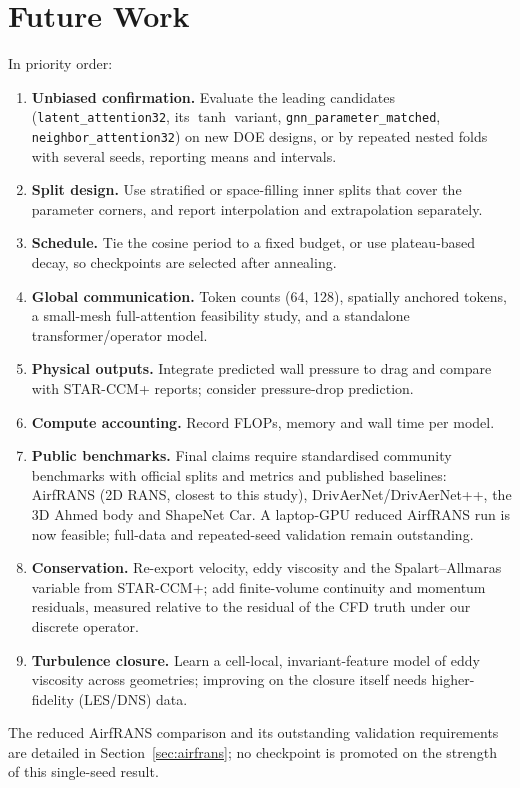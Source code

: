 \documentclass[journal]{IEEEtran}
\begin{document}
\section{Future Work}
\label{sec:future}
In priority order:
\begin{enumerate}
\item \textbf{Unbiased confirmation.} Evaluate the leading candidates
(\texttt{latent\_attention32}, its $\tanh$ variant, \texttt{gnn\_parameter\_matched},
\texttt{neighbor\_attention32}) on new DOE designs, or by repeated nested
folds with several seeds, reporting means and intervals.
\item \textbf{Split design.} Use stratified or space-filling inner splits that
cover the parameter corners, and report interpolation and extrapolation
separately.
\item \textbf{Schedule.} Tie the cosine period to a fixed budget, or use
plateau-based decay, so checkpoints are selected after annealing.
\item \textbf{Global communication.} Token counts (64, 128), spatially anchored
tokens, a small-mesh full-attention feasibility study, and a standalone
transformer/operator model.
\item \textbf{Physical outputs.} Integrate predicted wall pressure to drag and
compare with STAR-CCM+ reports; consider pressure-drop prediction.
\item \textbf{Compute accounting.} Record FLOPs, memory and wall time per model.
\item \textbf{Public benchmarks.} Final claims require standardised community
benchmarks with official splits and metrics and published baselines: AirfRANS
(2D RANS, closest to this study), DrivAerNet/DrivAerNet++, the 3D Ahmed body
and ShapeNet Car. A laptop-GPU reduced AirfRANS run is now feasible; full-data
and repeated-seed validation remain outstanding.
\item \textbf{Conservation.} Re-export velocity, eddy viscosity and the
Spalart--Allmaras variable from STAR-CCM+; add finite-volume continuity and
momentum residuals, measured relative to the residual of the CFD truth under
our discrete operator.
\item \textbf{Turbulence closure.} Learn a cell-local, invariant-feature model
of eddy viscosity across geometries; improving on the closure itself needs
higher-fidelity (LES/DNS) data.
\end{enumerate}
The reduced AirfRANS comparison and its outstanding validation requirements
are detailed in Section~\ref{sec:airfrans}; no checkpoint is promoted on the
strength of this single-seed result.
\end{document}
